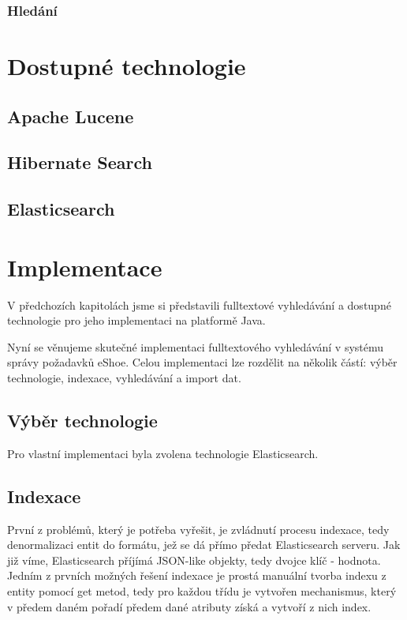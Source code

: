 \documentclass[11pt,draft,oneside]{fithesis2}
\begin{document}
\subsection{Hledání}


\chapter{Dostupné technologie}
\section{Apache Lucene}

\section{Hibernate Search}

\section{Elasticsearch}

\chapter{Implementace}
V předchozích kapitolách jsme si představili fulltextové vyhledávání a dostupné technologie pro jeho implementaci na platformě Java. 

Nyní se věnujeme skutečné implementaci fulltextového vyhledávání v systému správy požadavků eShoe. Celou implementaci lze rozdělit na několik částí: výběr technologie, indexace, vyhledávání a import dat.

\section{Výběr technologie}
Pro vlastní implementaci byla zvolena technologie Elasticsearch. 

\section{Indexace}
První z problémů, který je potřeba vyřešit, je zvládnutí procesu indexace, tedy denormalizaci entit do formátu, jež se dá přímo předat Elasticsearch serveru. Jak již víme, Elasticsearch příjímá JSON-like objekty,
tedy dvojce klíč - hodnota.
Jedním z prvních možných řešení indexace je prostá manuální tvorba indexu z entity pomocí get metod, tedy pro každou třídu je vytvořen mechanismus, který v předem daném pořadí předem dané atributy získá a vytvoří z nich index.
\end{document}
